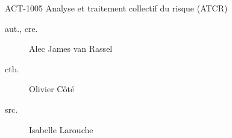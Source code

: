 \begin{contrib}{ACT-1005\: Analyse et traitement collectif du risque (ATCR)}
\begin{description}
	\item[aut., cre.] Alec James van Rassel
	\item[ctb.]	Olivier Côté
	\item[src.]	Isabelle Larouche
\end{description}
\end{contrib}